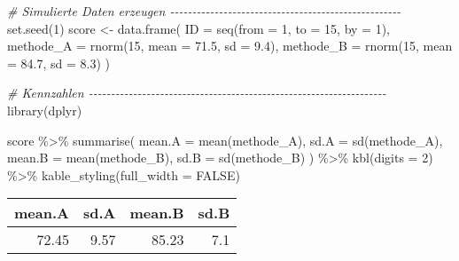 \documentclass[
]{book}
\newenvironment{Shaded}{\begin{snugshade}}{\end{snugshade}}
\newcommand{\AttributeTok}[1]{\textcolor[rgb]{0.77,0.63,0.00}{#1}}
\newcommand{\CommentTok}[1]{\textcolor[rgb]{0.56,0.35,0.01}{\textit{#1}}}
\newcommand{\ConstantTok}[1]{\textcolor[rgb]{0.00,0.00,0.00}{#1}}
\newcommand{\DecValTok}[1]{\textcolor[rgb]{0.00,0.00,0.81}{#1}}
\newcommand{\FloatTok}[1]{\textcolor[rgb]{0.00,0.00,0.81}{#1}}
\newcommand{\FunctionTok}[1]{\textcolor[rgb]{0.00,0.00,0.00}{#1}}
\newcommand{\NormalTok}[1]{#1}
\newcommand{\OtherTok}[1]{\textcolor[rgb]{0.56,0.35,0.01}{#1}}
\newcommand{\SpecialCharTok}[1]{\textcolor[rgb]{0.00,0.00,0.00}{#1}}
\begin{document}
\begin{Shaded}
\begin{Highlighting}[]
\CommentTok{\# Simulierte Daten erzeugen {-}{-}{-}{-}{-}{-}{-}{-}{-}{-}{-}{-}{-}{-}{-}{-}{-}{-}{-}{-}{-}{-}{-}{-}{-}{-}{-}{-}{-}{-}{-}{-}{-}{-}{-}{-}{-}{-}{-}{-}{-}{-}{-}{-}{-}{-}{-}{-}{-}{-}{-}{-}}
\FunctionTok{set.seed}\NormalTok{(}\DecValTok{1}\NormalTok{)}
\NormalTok{score }\OtherTok{\textless{}{-}} \FunctionTok{data.frame}\NormalTok{(}
  \AttributeTok{ID =} \FunctionTok{seq}\NormalTok{(}\AttributeTok{from =} \DecValTok{1}\NormalTok{, }\AttributeTok{to =} \DecValTok{15}\NormalTok{, }\AttributeTok{by =} \DecValTok{1}\NormalTok{),}
  \AttributeTok{methode\_A =} \FunctionTok{rnorm}\NormalTok{(}\DecValTok{15}\NormalTok{, }\AttributeTok{mean =} \FloatTok{71.5}\NormalTok{, }\AttributeTok{sd =} \FloatTok{9.4}\NormalTok{),}
  \AttributeTok{methode\_B =} \FunctionTok{rnorm}\NormalTok{(}\DecValTok{15}\NormalTok{, }\AttributeTok{mean =} \FloatTok{84.7}\NormalTok{, }\AttributeTok{sd =} \FloatTok{8.3}\NormalTok{)}
\NormalTok{)}

\CommentTok{\# Kennzahlen {-}{-}{-}{-}{-}{-}{-}{-}{-}{-}{-}{-}{-}{-}{-}{-}{-}{-}{-}{-}{-}{-}{-}{-}{-}{-}{-}{-}{-}{-}{-}{-}{-}{-}{-}{-}{-}{-}{-}{-}{-}{-}{-}{-}{-}{-}{-}{-}{-}{-}{-}{-}{-}{-}{-}{-}{-}{-}{-}{-}{-}{-}{-}{-}{-}{-}{-}}
\FunctionTok{library}\NormalTok{(dplyr)}

\NormalTok{score }\SpecialCharTok{\%\textgreater{}\%} 
  \FunctionTok{summarise}\NormalTok{(}
    \AttributeTok{mean.A =} \FunctionTok{mean}\NormalTok{(methode\_A),}
    \AttributeTok{sd.A =} \FunctionTok{sd}\NormalTok{(methode\_A),}
    \AttributeTok{mean.B =} \FunctionTok{mean}\NormalTok{(methode\_B),}
    \AttributeTok{sd.B =} \FunctionTok{sd}\NormalTok{(methode\_B)}
\NormalTok{  ) }\SpecialCharTok{\%\textgreater{}\%} 
  \FunctionTok{kbl}\NormalTok{(}\AttributeTok{digits =} \DecValTok{2}\NormalTok{) }\SpecialCharTok{\%\textgreater{}\%} 
  \FunctionTok{kable\_styling}\NormalTok{(}\AttributeTok{full\_width =} \ConstantTok{FALSE}\NormalTok{)}
\end{Highlighting}
\end{Shaded}

\begin{table}
\centering
\begin{tabular}[t]{r|r|r|r}
\hline
mean.A & sd.A & mean.B & sd.B\\
\hline
72.45 & 9.57 & 85.23 & 7.1\\
\hline
\end{tabular}
\end{table}
\end{document}
